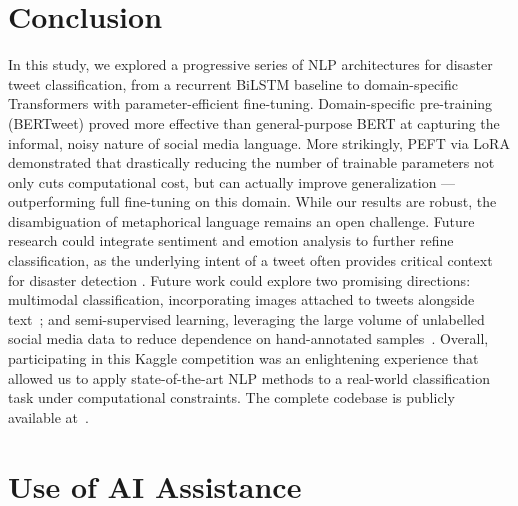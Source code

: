 \documentclass[conference]{IEEEtran}
\begin{document}

\section{Conclusion}
In this study, we explored a progressive series of NLP architectures for disaster tweet classification, from a recurrent BiLSTM baseline  to domain-specific Transformers with parameter-efficient fine-tuning. Domain-specific pre-training (BERTweet) proved more effective than  general-purpose BERT at capturing the informal, noisy nature of social  media language. More strikingly, PEFT via LoRA demonstrated that  drastically reducing the number of trainable parameters not only cuts  computational cost, but can actually improve generalization —  outperforming full fine-tuning on this domain. While our results are robust, the disambiguation of metaphorical language remains an open challenge. Future research could integrate sentiment and emotion analysis to further refine classification, as the underlying intent of a tweet often provides critical context for disaster detection \cite{mahalavanya_github}. Future work could explore two promising directions: multimodal classification, incorporating images attached to tweets alongside text~\cite{basit2023multimodal}; and semi-supervised learning, leveraging the large volume of unlabelled social media data to reduce dependence on hand-annotated samples~\cite{popovici2025multihead}. Overall, participating in this Kaggle competition was an enlightening experience that allowed us to apply state-of-the-art NLP methods to a real-world classification task under computational constraints. The complete  codebase is publicly available at~\cite{our_github}.


\section{Use of AI Assistance}
\end{document}
